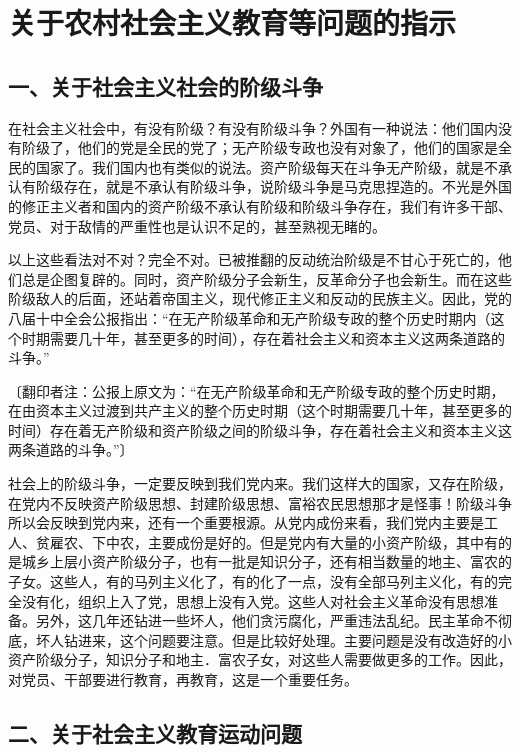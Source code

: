 \section[关于农村社会主义教育等问题的指示（一九六三年五月）]{关于农村社会主义教育等问题的指示}


\subsection{一、关于社会主义社会的阶级斗争}

在社会主义社会中，有没有阶级？有没有阶级斗争？外国有一种说法：他们国内没有阶级了，他们的党是全民的党了；无产阶级专政也没有对象了，他们的国家是全民的国家了。我们国内也有类似的说法。资产阶级每天在斗争无产阶级，就是不承认有阶级存在，就是不承认有阶级斗争，说阶级斗争是马克思捏造的。不光是外国的修正主义者和国内的资产阶级不承认有阶级和阶级斗争存在，我们有许多干部、党员、对于敌情的严重性也是认识不足的，甚至熟视无睹的。

以上这些看法对不对？完全不对。已被推翻的反动统治阶级是不甘心于死亡的，他们总是企图复辟的。同时，资产阶级分子会新生，反革命分子也会新生。而在这些阶级敌人的后面，还站着帝国主义，现代修正主义和反动的民族主义。因此，党的八届十中全会公报指出：“在无产阶级革命和无产阶级专政的整个历史时期内（这个时期需要几十年，甚至更多的时间），存在着社会主义和资本主义这两条道路的斗争。”

〔翻印者注：公报上原文为：“在无产阶级革命和无产阶级专政的整个历史时期，在由资本主义过渡到共产主义的整个历史时期（这个时期需要几十年，甚至更多的时间）存在着无产阶级和资产阶级之间的阶级斗争，存在着社会主义和资本主义这两条道路的斗争。”〕

社会上的阶级斗争，一定要反映到我们党内来。我们这样大的国家，又存在阶级，在党内不反映资产阶级思想、封建阶级思想、富裕农民思想那才是怪事！阶级斗争所以会反映到党内来，还有一个重要根源。从党内成份来看，我们党内主要是工人、贫雇农、下中农，主要成份是好的。但是党内有大量的小资产阶级，其中有的是城乡上层小资产阶级分子，也有一批是知识分子，还有相当数量的地主、富农的子女。这些人，有的马列主义化了，有的化了一点，没有全部马列主义化，有的完全没有化，组织上入了党，思想上没有入党。这些人对社会主义革命没有思想准备。另外，这几年还钻进一些坏人，他们贪污腐化，严重违法乱纪。民主革命不彻底，坏人钻进来，这个问题要注意。但是比较好处理。主要问题是没有改造好的小资产阶级分子，知识分子和地主．富农子女，对这些人需要做更多的工作。因此，对党员、干部要进行教育，再教育，这是一个重要任务。

\subsection{二、关于社会主义教育运动问题}

